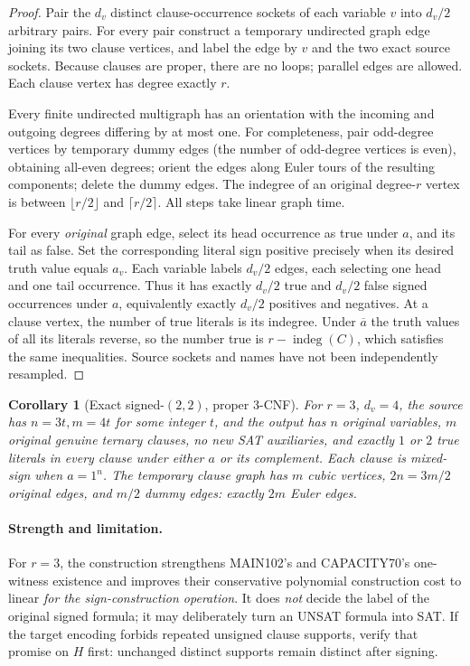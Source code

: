 \documentclass[11pt]{article}
\newtheorem{corollary}{Corollary}
\begin{document}
\begin{proof}
Pair the \(d_v\) distinct clause-occurrence sockets of each variable \(v\) into \(d_v/2\) arbitrary pairs. For every pair construct a temporary undirected graph edge joining its two clause vertices, and label the edge by \(v\) and the two exact source sockets. Because clauses are proper, there are no loops; parallel edges are allowed. Each clause vertex has degree exactly \(r\).

Every finite undirected multigraph has an orientation with the incoming and outgoing degrees differing by at most one. For completeness, pair odd-degree vertices by temporary dummy edges (the number of odd-degree vertices is even), obtaining all-even degrees; orient the edges along Euler tours of the resulting components; delete the dummy edges. The indegree of an original degree-\(r\) vertex is between \(\lfloor r/2\rfloor\) and \(\lceil r/2\rceil\). All steps take linear graph time.

For every \emph{original} graph edge, select its head occurrence as true under \(a\), and its tail as false. Set the corresponding literal sign positive precisely when its desired truth value equals \(a_v\). Each variable labels \(d_v/2\) edges, each selecting one head and one tail occurrence. Thus it has exactly \(d_v/2\) true and \(d_v/2\) false signed occurrences under \(a\), equivalently exactly \(d_v/2\) positives and negatives. At a clause vertex, the number of true literals is its indegree. Under \(\overline a\) the truth values of all its literals reverse, so the number true is \(r-\operatorname{indeg}(C)\), which satisfies the same inequalities. Source sockets and names have not been independently resampled.
\end{proof}

\begin{corollary}[Exact signed-$(2,2)$, proper 3-CNF]
For \(r=3\), \(d_v=4\), the source has \(n=3t,m=4t\) for some integer \(t\), and the output has \(n\) original variables, \(m\) original genuine ternary clauses, no new SAT auxiliaries, and exactly \(1\) or \(2\) true literals in every clause under either \(a\) or its complement. Each clause is mixed-sign when \(a=1^n\). The temporary clause graph has \(m\) cubic vertices, \(2n=3m/2\) original edges, and \(m/2\) dummy edges: exactly \(2m\) Euler edges.
\end{corollary}

\paragraph{Strength and limitation.}
For \(r=3\), the construction strengthens MAIN102's and CAPACITY70's one-witness existence and improves their conservative polynomial construction cost to linear \emph{for the sign-construction operation}. It does \emph{not} decide the label of the original signed formula; it may deliberately turn an UNSAT formula into SAT. If the target encoding forbids repeated unsigned clause supports, verify that promise on \(H\) first: unchanged distinct supports remain distinct after signing.
\end{document}
